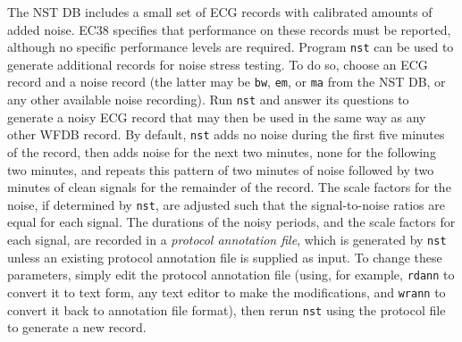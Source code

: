 \documentclass[twoside]{article}
\begin{document}
The NST DB includes a small set of ECG records with calibrated amounts
of added noise.  EC38 specifies that performance on these records must
be reported, although no specific performance levels are required.
Program {\tt nst} can be used to generate additional records for noise
stress testing.  To do so, choose an ECG record and a noise record
(the latter may be {\tt bw}, {\tt em}, or {\tt ma} from the NST DB, or
any other available noise recording).  Run {\tt nst} and answer its
questions to generate a noisy ECG record that may then be used in the
same way as any other WFDB record.  By default, {\tt nst} adds no noise
during the first five minutes of the record, then adds noise for the
next two minutes, none for the following two minutes, and repeats this
pattern of two minutes of noise followed by two minutes of clean
signals for the remainder of the record.  The scale factors for the
noise, if determined by {\tt nst}, are adjusted such that the
signal-to-noise ratios are equal for each signal.  The durations of
the noisy periods, and the scale factors for each signal, are recorded
in a {\em protocol annotation file}, which is generated by {\tt nst}
unless an existing protocol annotation file is supplied as input.  To
change these parameters, simply edit the protocol annotation file
(using, for example, {\tt rdann} to convert it to text form, any text
editor to make the modifications, and {\tt wrann} to convert it back
to annotation file format), then rerun {\tt nst} using the protocol
file to generate a new record.
\end{document}
